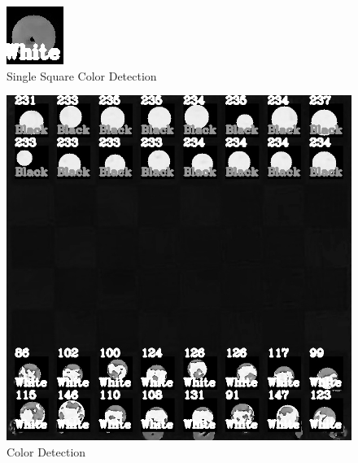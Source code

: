 \documentclass[journal]{IEEEtran}
\begin{document}
\begin{figure}[!ht]
	\centering
	\includegraphics[width=\linewidth]{Images/ColorDetection340Zoomed.jpg}
	\caption{Single Square Color Detection}
	\label{color zoomed}
\end{figure}

\begin{figure}[!ht]
	\centering
	\includegraphics[width=\linewidth]{Images/ColorDetection.jpg}
	\caption{Color Detection}
	\label{color}
\end{figure}
\end{document}
